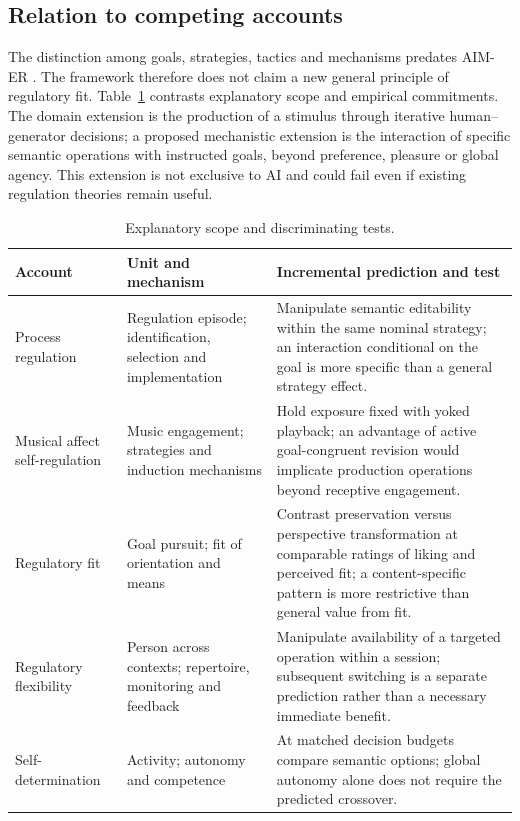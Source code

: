 \subsection{Relation to competing accounts}
The distinction among goals, strategies, tactics and mechanisms predates AIM-ER \citep{baltazar2016,baltazar2019}. The framework therefore does not claim a new general principle of regulatory fit. Table~\ref{tab:competing} contrasts explanatory scope and empirical commitments. The domain extension is the production of a stimulus through iterative human--generator decisions; a proposed mechanistic extension is the interaction of specific semantic operations with instructed goals, beyond preference, pleasure or global agency. This extension is not exclusive to AI and could fail even if existing regulation theories remain useful.

\begin{table}[htbp]
\centering\small
\caption{Explanatory scope and discriminating tests.}
\label{tab:competing}
\begin{tabularx}{\linewidth}{@{}>{\raggedright\arraybackslash}p{.26\linewidth}>{\raggedright\arraybackslash}p{.27\linewidth}>{\raggedright\arraybackslash}X@{}}
\toprule
Account & Unit and mechanism & Incremental prediction and test \\
\midrule
Process regulation \citep{gross2015} & Regulation episode; identification, selection and implementation & Manipulate semantic editability within the same nominal strategy; an interaction conditional on the goal is more specific than a general strategy effect. \\
Musical affect self-regulation \citep{baltazar2019} & Music engagement; strategies and induction mechanisms & Hold exposure fixed with yoked playback; an advantage of active goal-congruent revision would implicate production operations beyond receptive engagement. \\
Regulatory fit \citep{higgins2000} & Goal pursuit; fit of orientation and means & Contrast preservation versus perspective transformation at comparable ratings of liking and perceived fit; a content-specific pattern is more restrictive than general value from fit. \\
Regulatory flexibility \citep{bonanno2013} & Person across contexts; repertoire, monitoring and feedback & Manipulate availability of a targeted operation within a session; subsequent switching is a separate prediction rather than a necessary immediate benefit. \\
Self-determination \citep{ryan2000} & Activity; autonomy and competence & At matched decision budgets compare semantic options; global autonomy alone does not require the predicted crossover. \\
\bottomrule
\end{tabularx}
\end{table}

